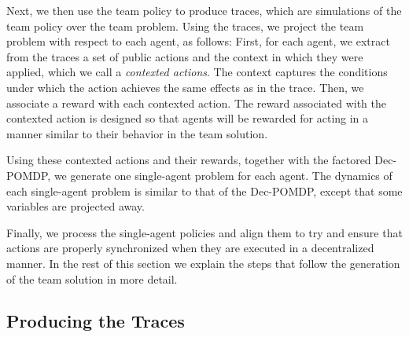 \documentclass[letterpaper]{article} %
\theoremstyle{definition}
\newcommand{\eliran}[1]{\textbf{[\color{red}ELIRAN:#1]}}
\begin{document}
Next, we then use the team policy to produce traces, which are simulations of the team policy over the team problem. Using the traces, we project the team problem with respect to each agent, as follows:
First, for each agent, we extract from the traces a set of public actions and the context in which they were applied, which we call a {\em contexted actions}. The context captures the conditions under which the action achieves the same effects as in the trace. Then, we associate a reward with each  contexted action. The reward associated with the contexted action is designed so that agents will be rewarded for acting in a manner similar to their
behavior in the team solution.

Using these contexted actions and their rewards, together with the factored Dec-POMDP, we  generate
one single-agent problem for each agent. The dynamics of each single-agent problem is similar to that of the Dec-POMDP, except that some variables are projected away. 

Finally, we process the single-agent policies and align them to try and ensure that actions are properly synchronized when they are executed in a decentralized manner. 
In the rest of this section we explain the steps that follow the
generation of the team solution in more detail.



\subsection{Producing the Traces}
\end{document}
